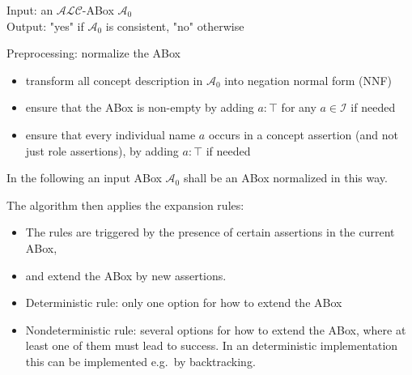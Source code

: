 \begin{mdframed}[frametitle= Description of the tableau algorithm]
Input: an $\mathcal{ALC}$-ABox $\mathcal{A}_0$ \\
Output: "yes" if $\mathcal{A}_0$ is consistent, "no" otherwise

Preprocessing: normalize the ABox
\begin{itemize}
	\item transform all concept description in $\mathcal{A}_0$ into negation normal form (NNF)
	\item ensure that the ABox is non-empty by adding $a: \top$ for any $a \in \mathscr{I}$ if needed
	\item ensure that every individual name $a$ occurs in a concept assertion (and not just role assertions), by adding $a : \top$ if needed
\end{itemize}
In the following an input ABox $\mathcal{A}_0$ shall be an ABox normalized in this way.

The algorithm then applies the expansion rules:
\begin{itemize}
	\item The rules are triggered by the presence of certain assertions in the current ABox,
	\item and extend the ABox by new assertions.
	\item Deterministic rule: only one option for how to extend the ABox
	\item Nondeterministic rule: several options for how to extend the ABox, where at least one of them must lead to success.
		In an deterministic implementation this can be implemented e.g.\ by backtracking.
\end{itemize}
\end{mdframed}


